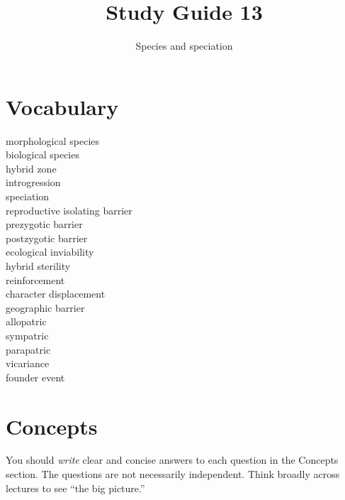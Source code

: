 \documentclass[letterpaper]{tufte-handout}
\title{Study Guide 13\hfill}
\author{Species and speciation}
\date{} %
\begin{document}
\maketitle	%

\section{Vocabulary}

\begin{multicols}{2}
morphological species\\
biological species\\
hybrid zone \\
introgression \\
speciation\\
reproductive isolating barrier\\
prezygotic barrier \\
postzygotic barrier \\
ecological inviability\\
hybrid sterility\\
reinforcement \\
character displacement \\
geographic barrier \\
allopatric \\
sympatric \\
parapatric \\
vicariance \\
founder event
\end{multicols}


\section{Concepts}

You should \emph{write} clear and concise answers to each question in the Concepts section.  The questions are not necessarily independent.  Think broadly across lectures to see ``the big picture.'' 
\end{document}
